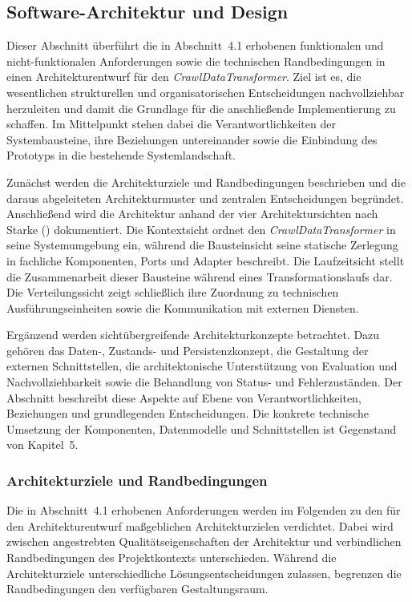 \subsection{Software-Architektur und Design}
\label{sec:software-architektur-und-design}

Dieser Abschnitt überführt die in Abschnitt~4.1 erhobenen funktionalen und nicht-funktionalen Anforderungen sowie die technischen Randbedingungen in einen Architekturentwurf 
für den \textit{CrawlDataTransformer}. Ziel ist es, die wesentlichen strukturellen und organisatorischen Entscheidungen nachvollziehbar herzuleiten und damit die Grundlage 
für die anschließende Implementierung zu schaffen. Im Mittelpunkt stehen dabei die Verantwortlichkeiten der Systembausteine, ihre Beziehungen untereinander sowie die 
Einbindung des Prototyps in die bestehende Systemlandschaft.

Zunächst werden die Architekturziele und Randbedingungen beschrieben und die daraus abgeleiteten Architekturmuster und zentralen Entscheidungen begründet. Anschließend 
wird die Architektur anhand der vier Architektursichten nach Starke (\cite{starke}) dokumentiert. Die Kontextsicht ordnet den \textit{CrawlDataTransformer} in seine 
Systemumgebung ein, während die Bausteinsicht seine statische Zerlegung in fachliche Komponenten, Ports und Adapter beschreibt. Die Laufzeitsicht stellt die Zusammenarbeit 
dieser Bausteine während eines Transformationslaufs dar. Die Verteilungssicht zeigt schließlich ihre Zuordnung zu technischen Ausführungseinheiten sowie die Kommunikation 
mit externen Diensten.

Ergänzend werden sichtübergreifende Architekturkonzepte betrachtet. Dazu gehören das Daten-, Zustands- und Persistenzkonzept, die Gestaltung der externen Schnittstellen, 
die architektonische Unterstützung von Evaluation und Nachvollziehbarkeit sowie die Behandlung von Status- und Fehlerzuständen. Der Abschnitt beschreibt diese Aspekte auf 
Ebene von Verantwortlichkeiten, Beziehungen und grundlegenden Entscheidungen. Die konkrete technische Umsetzung der Komponenten, Datenmodelle und Schnittstellen ist 
Gegenstand von Kapitel~5.

\subsubsection{Architekturziele und Randbedingungen}

Die in Abschnitt~4.1 erhobenen Anforderungen werden im Folgenden zu den für den Architekturentwurf maßgeblichen Architekturzielen verdichtet. Dabei wird zwischen angestrebten 
Qualitätseigenschaften der Architektur und verbindlichen Randbedingungen des Projektkontexts unterschieden. Während die Architekturziele unterschiedliche Lösungsentscheidungen 
zulassen, begrenzen die Randbedingungen den verfügbaren Gestaltungsraum.

